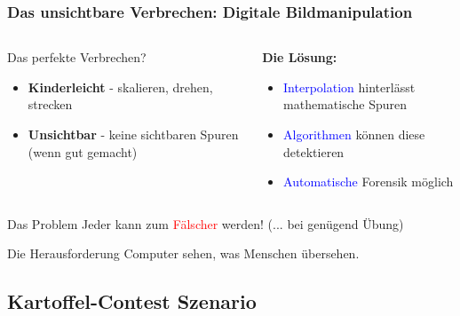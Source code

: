 \documentclass[11pt,t,usepdftitle=false,aspectratio=169]{beamer}
\begin{document}
\begin{frame}
	\frametitle{Das unsichtbare Verbrechen: Digitale Bildmanipulation}
	
	\begin{columns}[T]
		\begin{column}{0.48\textwidth}
			\begin{exampleblock}{Das perfekte Verbrechen?}
				\begin{itemize}
					\item \textbf{Kinderleicht} - skalieren, drehen, strecken
					\item \textbf{Unsichtbar} - keine sichtbaren Spuren (wenn gut gemacht)
				\end{itemize}
			\end{exampleblock}
		\end{column}
		\begin{column}{0.48\textwidth}
			\textbf{Die Lösung:}
			\begin{itemize}
				\item \textcolor{blue}{Interpolation} hinterlässt mathematische Spuren
				\item \textcolor{blue}{Algorithmen} können diese detektieren
				\item \textcolor{blue}{Automatische} Forensik möglich
			\end{itemize}
		\end{column}
	\end{columns}
	
	\vspace{0.5em}
	
	\begin{alertblock}{Das Problem}
		Jeder kann zum \textcolor{red}{Fälscher} werden! (... bei genügend Übung)
	\end{alertblock}
	
	\begin{block}{Die Herausforderung}
		Computer sehen, was Menschen übersehen.
	\end{block}
\end{frame}

\subsection{Kartoffel-Contest Szenario}
\end{document}
